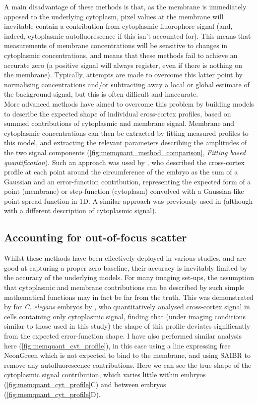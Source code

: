 \documentclass[12pt]{"report"}
\begin{document}
A main disadvantage of these methods is that, as the membrane is immediately apposed to the underlying cytoplasm, pixel values at the membrane will inevitable contain a contribution from cytoplasmic fluorophore signal (and, indeed, cytoplasmic autofluorescence if this isn't accounted for). This means that measurements of membrane concentrations will be sensitive to changes in cytoplasmic concentrations, and means that these methods fail to achieve an accurate zero (a positive signal will always register, even if there is nothing on the membrane). Typically, attempts are made to overcome this latter point by normalising concentrations and/or subtracting away a local or global estimate of the background signal, but this is often difficult and inaccurate.\\

More advanced methods have aimed to overcome this problem by building models to describe the expected shape of individual cross-cortex profiles, based on summed contributions of cytoplasmic and membrane signal. Membrane and cytoplasmic concentrations can then be extracted by fitting measured profiles to this model, and extracting the relevant parameters describing the amplitudes of the two signal components (\cref{fig:memquant_method_comparison}, \textit{Fitting based quantification}). Such an approach was used by \textcite{Gross2018}, who described the cross-cortex profile at each point around the circumference of the embryo as the sum of a Gaussian and an error-function contribution, representing the expected form of a point (membrane) or step-function (cytoplasm) convolved with a Gaussian-like point spread function in 1D. A similar approach was previously used in \textcite{Blanchoud2015} (although with a different description of cytoplasmic signal).\\

\subsection{Accounting for out-of-focus scatter}

Whilst these methods have been effectively deployed in various studies, and are good at capturing a proper zero baseline, their accuracy is inevitably limited by the accuracy of the underlying models. For many imaging set-ups, the assumption that cytoplasmic and membrane contributions can be described by such simple mathematical functions may in fact be far from the truth. This was demonstrated by for \textit{C. elegans} embryos by \textcite{Reich2019a}, who quantitatively analysed cross-cortex signal in cells containing only cytoplasmic signal, finding that (under imaging conditions similar to those used in this study) the shape of this profile deviates significantly from the expected error-function shape. I have also performed similar analysis here  (\cref{fig:memquant_cyt_profile}), in this case using a line expressing free NeonGreen which is not expected to bind to the membrane, and using SAIBR to remove any autofluorescence contributions. Here we can see the true shape of the cytoplasmic signal contribution, which varies little within embryos (\cref{fig:memquant_cyt_profile}C) and between embryos (\cref{fig:memquant_cyt_profile}D).\\
\end{document}
